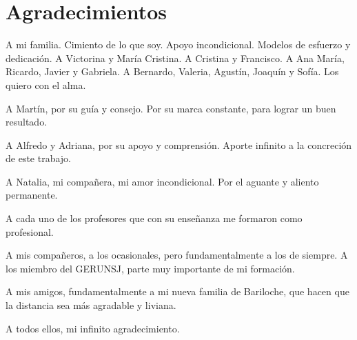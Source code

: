 \chapter*{Agradecimientos}
A mi familia. Cimiento de lo que soy. Apoyo incondicional. Modelos de esfuerzo y dedicación. A Victorina y María Cristina. A Cristina y Francisco. A Ana María, Ricardo, Javier y Gabriela. A Bernardo, Valeria, Agustín, Joaquín y Sofía. Los quiero con el alma.

A Martín, por su guía y consejo. Por su marca constante, para lograr un buen resultado.

A Alfredo y Adriana, por su apoyo y comprensión. Aporte infinito a la concreción de este trabajo.

A Natalia, mi compañera, mi amor incondicional. Por el aguante y aliento permanente.

A cada uno de los profesores que con su enseñanza me formaron como profesional.

A mis compañeros, a los ocasionales, pero fundamentalmente a los de siempre. A los miembro del GERUNSJ, parte muy importante de mi formación.

A mis amigos, fundamentalmente a mi nueva familia de Bariloche, que hacen que la distancia sea más agradable y liviana.

A todos ellos, mi infinito agradecimiento.